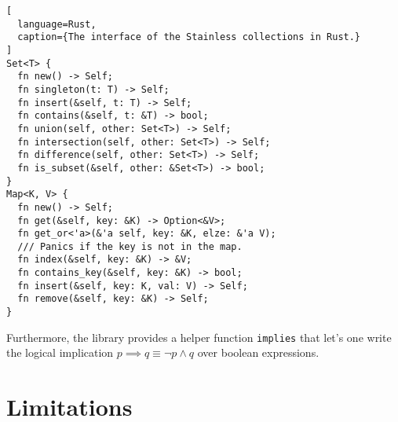 \begin{lstlisting}[
  language=Rust,
  caption={The interface of the Stainless collections in Rust.}
]
Set<T> {
  fn new() -> Self;
  fn singleton(t: T) -> Self;
  fn insert(&self, t: T) -> Self;
  fn contains(&self, t: &T) -> bool;
  fn union(self, other: Set<T>) -> Self;
  fn intersection(self, other: Set<T>) -> Self;
  fn difference(self, other: Set<T>) -> Self;
  fn is_subset(&self, other: &Set<T>) -> bool;
}
Map<K, V> {
  fn new() -> Self;
  fn get(&self, key: &K) -> Option<&V>;
  fn get_or<'a>(&'a self, key: &K, elze: &'a V);
  /// Panics if the key is not in the map.
  fn index(&self, key: &K) -> &V;
  fn contains_key(&self, key: &K) -> bool;
  fn insert(&self, key: K, val: V) -> Self;
  fn remove(&self, key: &K) -> Self;
}
\end{lstlisting}

Furthermore, the library provides a helper function
\passthrough{\lstinline!implies!} that let's one write the logical
implication $p \implies q \equiv \neg{p} \land q$ over boolean expressions.





\section{Limitations}
\label{impl-limitations}
